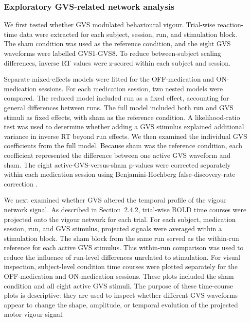 \documentclass[utf8]{FrontiersinHarvard}
\begin{document}
\subsubsection{Exploratory GVS-related network analysis}
We first tested whether GVS modulated behavioural vigour. Trial-wise reaction-time data were extracted for each subject, session, run, and stimulation block. The sham condition was used as the reference condition, and the eight GVS waveforms were labelled GVS1-GVS8. To reduce between-subject scaling differences, inverse RT values were z-scored within each subject and session.

Separate mixed-effects models were fitted for the OFF-medication and ON-medication sessions. For each medication session, two nested models were compared. The reduced model included run as a fixed effect, accounting for general differences between runs. The full model included both run and GVS stimuli as fixed effects, with sham as the reference condition. A likelihood-ratio test was used to determine whether adding a GVS stimulus explained additional variance in inverse RT beyond run effects. We then examined the individual GVS coefficients from the full model. Because sham was the reference condition, each coefficient represented the difference between one active GVS waveform and sham. The eight active-GVS-versus-sham p-values were corrected separately within each medication session using Benjamini-Hochberg false-discovery-rate correction \citep{benjamini1995controlling}.

We next examined whether GVS altered the temporal profile of the vigour network signal. As described in Section~2.4.2, trial-wise BOLD time courses were projected onto the vigour network for each trial. For each subject, medication session, run, and GVS stimulus, projected signals were averaged within a stimulation block. The sham block from the same run served as the within-run reference for each active GVS stimulus. This within-run comparison was used to reduce the influence of run-level differences unrelated to stimulation. For visual inspection, subject-level condition time courses were plotted separately for the OFF-medication and ON-medication sessions. These plots included the sham condition and all eight active GVS stimuli. The purpose of these time-course plots is descriptive: they are used to inspect whether different GVS waveforms appear to change the shape, amplitude, or temporal evolution of the projected motor-vigour signal.
\end{document}
